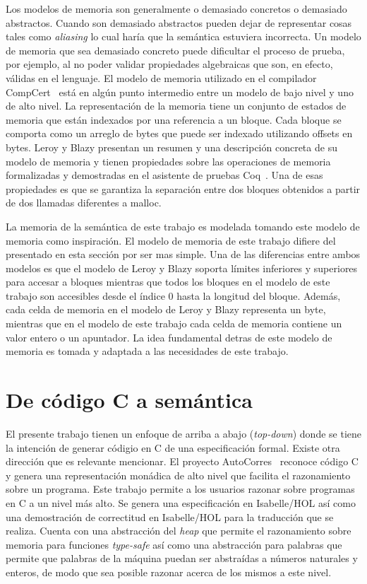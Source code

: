 Los modelos de memoria son generalmente o demasiado concretos o demasiado abstractos.
Cuando son demasiado abstractos pueden dejar de representar cosas tales como \textit{aliasing} lo cual haría que la semántica estuviera incorrecta.
Un modelo de memoria que sea demasiado concreto puede dificultar el proceso de prueba, por ejemplo, al no poder validar propiedades algebraicas que son, en efecto, válidas en el lenguaje.
El modelo de memoria utilizado en el compilador CompCert~\cite{leroy-blazy-memory-model} está en algún punto intermedio entre un modelo de bajo nivel y uno de alto nivel.
La representación de la memoria tiene un conjunto de estados de memoria que están indexados por una referencia a un bloque.
Cada bloque se comporta como un arreglo de bytes que puede ser indexado utilizando offsets en bytes.
Leroy y Blazy presentan un resumen y una descripción concreta de su modelo de memoria y tienen propiedades sobre las operaciones de memoria formalizadas y demostradas en el asistente de pruebas Coq~\cite{coq-doc}.
Una de esas propiedades es que se garantiza la separación entre dos bloques obtenidos a partir de dos llamadas diferentes a malloc.

La memoria de la semántica de este trabajo es modelada tomando este modelo de memoria como inspiración.
El modelo de memoria de este trabajo difiere del presentado en esta sección por ser mas simple.
Una de las diferencias entre ambos modelos es que el modelo de Leroy y Blazy soporta límites inferiores y superiores para accesar a bloques mientras que todos los bloques en el modelo de este trabajo son accesibles desde el índice $0$ hasta la longitud del bloque.
Además, cada celda de memoria en el modelo de Leroy y Blazy representa un byte, mientras que en el modelo de este trabajo cada celda de memoria contiene un valor entero o un apuntador.
La idea fundamental detras de este modelo de memoria es tomada y adaptada a las necesidades de este trabajo.


\section{De código C a semántica}

El presente trabajo tienen un enfoque de arriba a abajo (\textit{top-down}) donde se tiene la intención de generar códigio en C de una especificación formal.
Existe otra dirección que es relevante mencionar.
El proyecto AutoCorres~\cite{autocorres} reconoce código C y genera una representación monádica de alto nivel que facilita el razonamiento sobre un programa.
Este trabajo permite a los usuarios razonar sobre programas en C a un nivel más alto.
Se genera una especificación en Isabelle/HOL así como una demostración de correctitud en Isabelle/HOL para la traducción que se realiza.
Cuenta con una abstracción del \textit{heap} que permite el razonamiento sobre memoria para funciones \textit{type-safe} así como una abstracción para palabras que permite que palabras de la máquina puedan ser abstraídas a números naturales y enteros, de modo que sea posible razonar acerca de los mismos a este nivel.

